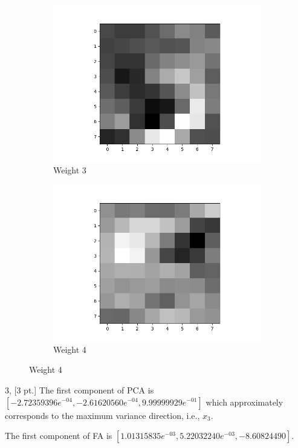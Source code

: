 \documentclass[12pt,letterpaper]{article}
\begin{document}
\begin{figure}
\begin{subfigure}[b]{0.24\textwidth}
        \includegraphics[width=\textwidth]{imgs/FA_weight_3.png}
        \caption{Weight 3}
        \label{FA_weight_3}
    \end{subfigure}
    \begin{subfigure}[b]{0.24\textwidth}
        \includegraphics[width=\textwidth]{imgs/FA_weight_4.png}
        \caption{Weight 4}
        \label{FA_weight_4}
    \end{subfigure}    
\end{figure}

3, [3 pt.]
The first component of PCA is $[-2.72359396e^{-04}, -2.61620560e^{-04}, 9.99999929e^{-01}]$ which approximately corresponds to the maximum variance direction, i.e., $x_3$.

The first component of FA is $[1.01315835e^{-03}, 5.22032240e^{-03}, -8.60824490]$.
\end{document}
